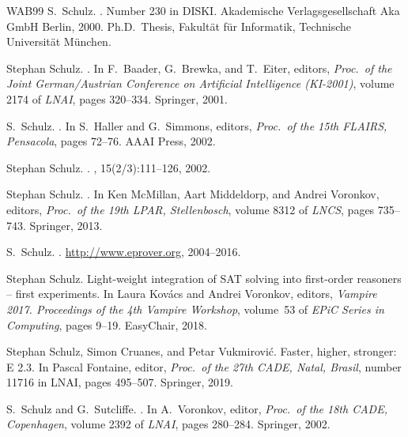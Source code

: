 \documentclass{report}
\begin{document}
\begin{thebibliography}{WAB{\etalchar{+}}99}
S.~Schulz.
.
\newblock Number 230 in DISKI. Akademische Verlagsgesellschaft Aka GmbH Berlin,
  2000.
\newblock Ph.D.~Thesis, Fakult{\"a}t f{\"u}r Informatik, Technische
  Universit{\"a}t M{\"u}nchen.

Stephan Schulz.
.
\newblock In F.~Baader, G.~Brewka, and T.~Eiter, editors, {\em Proc.\ of the
  Joint German/Austrian Conference on Artificial Intelligence (KI-2001)},
  volume 2174 of {\em LNAI}, pages 320--334. Springer, 2001.

S.~Schulz.
.
\newblock In S.~Haller and G.~Simmons, editors, {\em Proc.\ of the 15th FLAIRS,
  Pensacola}, pages 72--76. AAAI Press, 2002.

Stephan Schulz.
.
, 15(2/3):111--126, 2002.

Stephan Schulz.
.
\newblock In Ken McMillan, Aart Middeldorp, and Andrei Voronkov, editors, {\em
  Proc.\ of the 19th LPAR, Stellenbosch}, volume 8312 of {\em LNCS}, pages
  735--743. Springer, 2013.

S.~Schulz.
.
\newblock \url{http://www.eprover.org}, 2004--2016.

Stephan Schulz.
\newblock Light-weight integration of {SAT} solving into first-order reasoners
  -- first experiments.
\newblock In Laura Kov{\'a}cs and Andrei Voronkov, editors, {\em Vampire 2017.
  Proceedings of the 4th Vampire Workshop}, volume~53 of {\em EPiC Series in
  Computing}, pages 9--19. EasyChair, 2018.

Stephan Schulz, Simon Cruanes, and Petar Vukmirovi{\'c}.
\newblock Faster, higher, stronger: {E} 2.3.
\newblock In Pascal Fontaine, editor, {\em Proc.\ of the 27th CADE, Natal,
  Brasil}, number 11716 in LNAI, pages 495--507. Springer, 2019.

S.~Schulz and G.~Sutcliffe.
.
\newblock In A.~Voronkov, editor, {\em Proc.\ of the 18th CADE, Copenhagen},
  volume 2392 of {\em LNAI}, pages 280--284. Springer, 2002.


\end{thebibliography}
\end{document}
